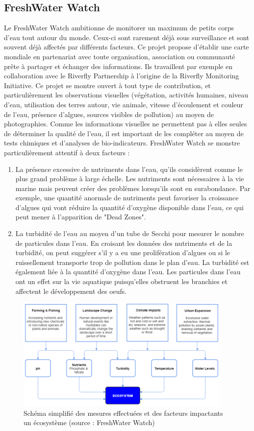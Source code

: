 \documentclass[10pt, article]{llncs}
\begin{document}
	\subsection{FreshWater Watch}
		Le FreshWater Watch ambitionne de monitorer un maximum de petits corps d'eau tout autour du monde. Ceux-ci sont rarement déjà sous surveillance et sont souvent déjà affectés par différents facteurs. Ce projet propose d'établir une carte mondiale en partenariat avec toute organisation, association ou communauté prête à partager et échanger des informations. Ils travaillent par exemple en collaboration avec le Riverfly Partnership à l'origine de la Riverfly Monitoring Initiative. Ce projet se montre ouvert à tout type de contribution, et particulièrement les observations visuelles (végétation, activités humaines, niveau d'eau, utilisation des terres autour, vie animale, vitesse d'écoulement et couleur de l'eau, présence d'algues, sources visibles de pollution) au moyen de photographies. Comme les informations visuelles ne permettent pas à elles seules de déterminer la qualité de l'eau, il est important de les compléter au moyen de tests chimiques et d'analyses de bio-indicateurs. FreshWater Watch se monstre particulièrement attentif à deux facteurs :
		\begin{enumerate}
			\item La présence excessive de nutriments dans l'eau, qu'ils considèrent comme le plus grand problème à large échelle. Les nutriments sont nécessaires à la vie marine mais peuvent créer des problèmes lorsqu'ils sont en surabondance. Par exemple, une quantité anormale de nutriments peut favoriser la croissance d'algues qui vont réduire la quantité d'oxygène disponible dans l'eau, ce qui peut mener à l'apparition de "Dead Zones".
			\item La turbidité de l'eau au moyen d'un tube de Secchi pour mesurer le nombre de particules dans l'eau. En croisant les données des nutriments et de la turbidité, on peut suggérer s'il y a eu une prolifération d'algues ou si le ruissellement transporte trop de pollution dans le plan d'eau. La turbidité est également liée à la quantité d'oxygène dans l'eau. Les particules dans l'eau ont un effet sur la vie aquatique puisqu'elles obstruent les branchies et affectent le développement des oeufs.
		\end{enumerate}
		\begin{figure}
			\begin{center}
				\includegraphics[width=300pt]{img/ecosystem-flowchart.png}
			\end{center}
			\caption{Schéma simplifié des mesures effectuées et des facteurs impactants un écosystème (source : FreshWater Watch)}
		\end{figure}
\end{document}
